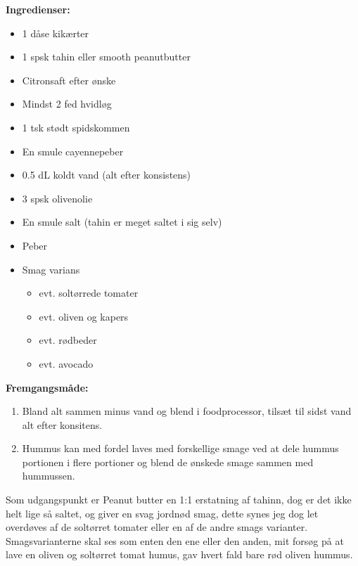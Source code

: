 \documentclass{book}
\begin{document}
\begin{minipage}[t]{0.5\textwidth}
\textbf{Ingredienser:}
\begin{itemize}
    \item 1 dåse kikærter
    \item 1 spsk tahin eller smooth peanutbutter
    \item Citronsaft efter ønske
    \item Mindst 2 fed hvidløg
    \item 1 tsk stødt spidskommen
    \item En smule cayennepeber
    \item 0.5 dL koldt vand (alt efter konsistens)
    \item 3 spsk olivenolie
    \item En smule salt (tahin er meget saltet i sig selv)
    \item Peber
    \item Smag varians
    \begin{itemize}
        \item evt. soltørrede tomater
        \item evt. oliven og kapers
        \item evt. rødbeder
        \item evt. avocado
    \end{itemize}
\end{itemize}
\end{minipage}
\begin{minipage}[t]{0.5\textwidth}
\textbf{Fremgangsmåde:}
\begin{enumerate}
    \item Bland alt sammen minus vand og blend i foodprocessor, tilsæt til sidst vand alt efter konsitens.
    \item Hummus kan med fordel laves med forskellige smage ved at dele hummus portionen i flere portioner og blend de ønskede smage sammen med hummussen.  
\end{enumerate}
\end{minipage}
Som udgangspunkt er Peanut butter en 1:1 erstatning af tahinn, dog er det ikke helt lige så saltet, og giver en svag jordnød smag, dette synes jeg dog let overdøves af de soltørret tomater eller en af de andre smags varianter. Smagsvarianterne skal ses som enten den ene eller den anden, mit forsøg på at lave en oliven og soltørret tomat humus, gav hvert fald bare rød oliven hummus.
\newpage
\end{document}
